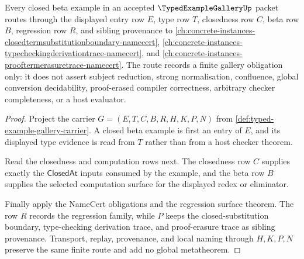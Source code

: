 \begin{theorem}
\label{thm:typed-example-gallery-closed-beta-regression-route}
Every closed beta example in an accepted $\TypedExampleGalleryUp$ packet routes through the displayed entry row $E$, type row $T$, closedness row $C$, beta row $B$, regression row $R$, and sibling provenance to \autoref{ch:concrete-instances-closedtermsubstitutionboundary-namecert}, \autoref{ch:concrete-instances-typecheckingderivationtrace-namecert}, and \autoref{ch:concrete-instances-prooftermerasuretrace-namecert}. The route records a finite gallery obligation only: it does not assert subject reduction, strong normalisation, confluence, global conversion decidability, proof-erased compiler correctness, arbitrary checker completeness, or a host evaluator.
\end{theorem}
\begin{proof}
Project the carrier $G=(E,T,C,B,R,H,K,P,N)$ from \autoref{def:typed-example-gallery-carrier}. A closed beta example is first an entry of $E$, and its displayed type evidence is read from $T$ rather than from a host checker theorem.

Read the closedness and computation rows next. The closedness row $C$ supplies exactly the $\mathsf{ClosedAt}$ inputs consumed by the example, and the beta row $B$ supplies the selected computation surface for the displayed redex or eliminator.

Finally apply the NameCert obligations and the regression surface theorem. The row $R$ records the regression family, while $P$ keeps the closed-substitution boundary, type-checking derivation trace, and proof-erasure trace as sibling provenance. Transport, replay, provenance, and local naming through $H,K,P,N$ preserve the same finite route and add no global metatheorem.
\end{proof}

